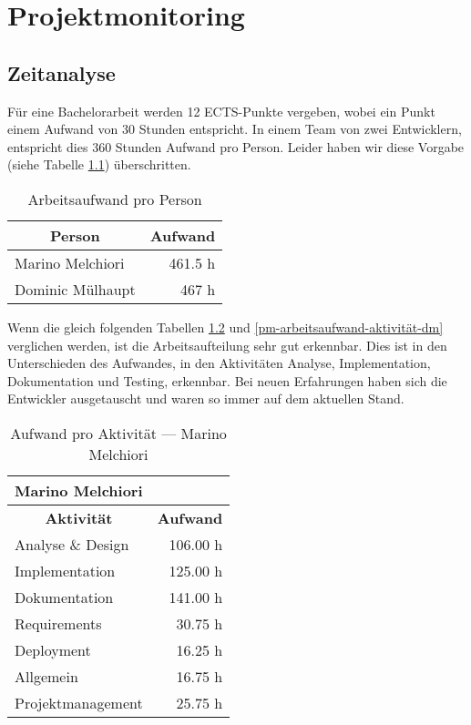 \chapter{Projektmonitoring}
\label{pm-projektmonitoring}

\section{Zeitanalyse}
Für eine Bachelorarbeit werden 12 ECTS-Punkte vergeben, wobei ein Punkt einem Aufwand von 30 Stunden entspricht.
In einem Team von zwei Entwicklern, entspricht dies 360 Stunden Aufwand pro Person. 
Leider haben wir diese Vorgabe (siehe Tabelle \ref{pm-arbeitsaufwand}) überschritten. 

\begin{table}[H]
\centering
\begin{tabular}{|l|r|}
\hline 
\multicolumn{1}{|c|}{\textbf{Person}} & \multicolumn{1}{|c|}{\textbf{Aufwand}} \\
\hline 
Marino Melchiori & 461.5 h \\
\hline 
Dominic Mülhaupt & 467 h \\  
\hline 
\end{tabular}
\caption{Arbeitsaufwand pro Person}
\label{pm-arbeitsaufwand}
\end{table}

Wenn die gleich folgenden Tabellen \ref{pm-arbeitsaufwand-aktivität-mm} und \ref{pm-arbeitsaufwand-aktivität-dm} verglichen werden, ist die Arbeitsaufteilung sehr gut erkennbar. 
Dies ist in den Unterschieden des Aufwandes, in den Aktivitäten Analyse, Implementation, Dokumentation und Testing, erkennbar. 
Bei neuen Erfahrungen haben sich die Entwickler ausgetauscht und waren so immer auf dem aktuellen Stand. 

\begin{table}[H]
\centering
\label{pm-arbeitsaufwand-aktivität-mm}
\begin{tabular}{|l|r|}
\hline
\multicolumn{2}{|l|}{\textbf{Marino Melchiori}} \\
\hline
\multicolumn{1}{|c|}{\textbf{Aktivität}} & \multicolumn{1}{|c|}{\textbf{Aufwand}} \\
\hline
Analyse \& Design & 106.00 h \\
\hline
Implementation & 125.00 h \\
\hline
Dokumentation & 141.00 h \\
\hline
Requirements & 30.75 h \\
\hline
Deployment & 16.25 h \\
\hline
Allgemein & 16.75 h \\
\hline
Projektmanagement & 25.75 h \\
\hline
\end{tabular}
\caption{Aufwand pro Aktivität --- Marino Melchiori}
\end{table}

